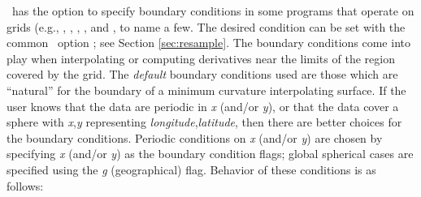 \GMT\ has the option to specify boundary conditions in some programs
that operate on grids (e.g., , ,
, , and
, to name a few.  The desired condition can be set with
the common \GMT\ option ; see Section \ref{sec:resample}.  The boundary conditions come into play
when interpolating or computing derivatives near the limits of the
region covered by the grid. The \emph{default} boundary
conditions used are those which are ``natural'' for the boundary
of a minimum curvature interpolating surface.
If the user knows that the data are periodic in \emph{x} (and/or
\emph{y}), or that the data cover a sphere with \emph{x},\emph{y}
representing \emph{longitude},\emph{latitude}, then there are better
choices for the boundary conditions.
Periodic conditions on \emph{x} (and/or \emph{y}) are chosen by
specifying \emph{x} (and/or \emph{y}) as the boundary condition flags;
global spherical cases are specified using the \emph{g} (geographical)
flag.  Behavior of these conditions is as follows:

